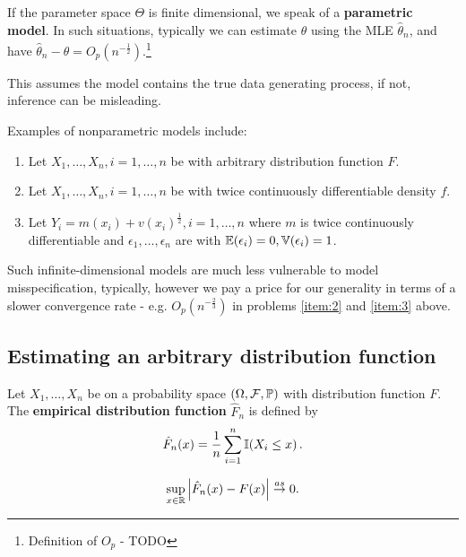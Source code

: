 If the parameter space $\Theta$ is finite dimensional, we speak of a
\textbf{parametric model}.  In such situations, typically we can
estimate $\theta$ using the MLE $\hat \theta_{n}$, and have $\hat
\theta_{n} - \theta = O_{p}(n^{-\frac{1}{2}})$.\footnote{Definition of
  $O_{p}$ - TODO}

This assumes the model contains the true data generating process, if
not, inference can be misleading.

Examples of nonparametric models include:
\begin{enumerate}
\item \label{item:1} Let $X_{1}, \dots, X_{n}, i = 1, \dots, n$ be \iid with arbitrary distribution
  function $F$.
\item \label{item:2} Let $X_{1}, \dots, X_{n}, i = 1, \dots, n$ be \iid with twice continuously differentiable
  density $f$.
\item \label{item:3} Let $Y_{i} = m(x_{i}) + v(x_{i})^{\frac{1}{2}}, i = 1, \dots,
  n$ where $m$ is twice continuously differentiable and $\epsilon_{1},
  \dots, \epsilon_{n}$ are \iid with $\E{\epsilon_{i}} = 0,
  \Var{\epsilon_{i}} = 1$.
\end{enumerate}

Such infinite-dimensional models are much less vulnerable to model
misspecification, typically, however we pay a price for our generality
in terms of a slower convergence rate - e.g. $O_{p}(n^{-\frac{2}{3}})$
in problems \ref{item:2} and \ref{item:3} above.

\subsection{Estimating an arbitrary distribution function}
\label{sec:estim-an-arbitr}

Let $X_{1}, \dots, X_{n}$ be \iid on a probability space $(\Omega,
\mathcal{F}, \Prob)$ with distribution function $F$.  The
\textbf{empirical distribution function} $\hat F_{n}$ is defined by
\begin{equation}
  \label{eq:1}
  \hat F_{n}(x) = \frac{1}{n} \sum_{i=1}^{n} \I{X_{i} \leq x}.
\end{equation}


\begin{thm}
  \label{defn:Introduction:2}
  \begin{equation}
    \label{eq:2}
    \sup_{x \in \mathbb{R}} \left| \hat F_{n}(x) - F(x) \right| \overset{as}{\rightarrow} 0.
  \end{equation}
\end{thm}

